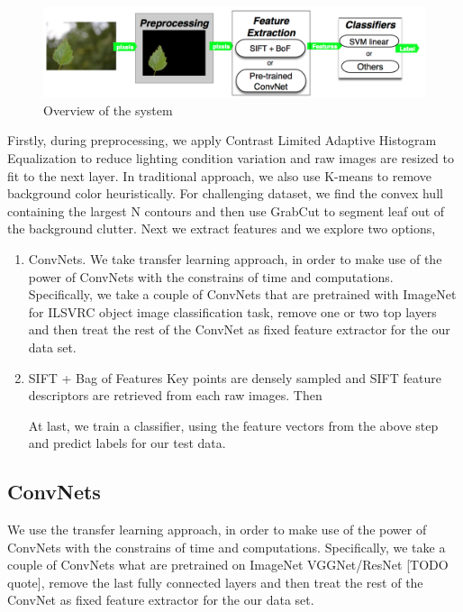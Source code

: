 \documentclass[journal]{IEEEtran}
\begin{document}
\newpage
\begin{figure}
  \center
  \includegraphics[scale=0.2]{overview}
  \caption{ Overview of the system }
  \label{fig:pipeline}
\end{figure}

  Firstly, during preprocessing, we apply Contrast Limited Adaptive Histogram Equalization to reduce lighting condition variation and raw images are resized to fit to the next layer. In traditional approach, we also use K-means to remove background color heuristically. For challenging dataset, we find the convex hull containing the largest N contours and then use GrabCut to segment leaf out of the background clutter.
  Next we extract features and we explore two options,
\begin{enumerate} \compresslist
  \item ConvNets.
    We take transfer learning approach, in order to make use of the power of ConvNets with the constrains of time and computations. Specifically, we take a couple of ConvNets that are pretrained with ImageNet for ILSVRC object image classification task, remove one or two top  layers and then treat the rest of the ConvNet as fixed feature extractor for the our data set.


  \item SIFT + Bag of Features
    Key points are densely sampled and SIFT feature descriptors are retrieved from each raw images. Then

    At last, we train a classifier, using the feature vectors from the above step and predict labels for our test data.
\end{enumerate}


\subsection{ConvNets}
We use the transfer learning approach, in order to make use of the power of ConvNets with the constrains of time and computations. Specifically, we take a couple of ConvNets what are pretrained on ImageNet  VGGNet/ResNet [TODO quote], remove the last fully connected layers and then treat the rest of the ConvNet as fixed feature extractor for the our data set.
\end{document}
